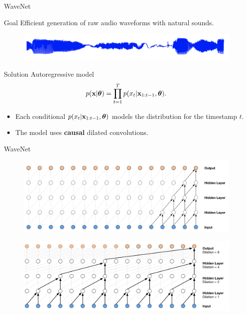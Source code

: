 \begin{frame}{WaveNet}
	\begin{block}{Goal}
		Efficient generation of raw audio waveforms with natural sounds.
	\end{block}
	\begin{figure}
	  \centering
	  \includegraphics[width=0.9\linewidth]{figs/wavenet_ex.png}
	\end{figure}
	\begin{block}{Solution}
		Autoregressive model
		\vspace{-0.3cm}
		\[
		    p(\mathbf{x}| \boldsymbol{\theta}) = \prod_{t=1}^T p(x_t|\mathbf{x}_{1:t-1}, \boldsymbol{\theta}).
		\]
		\vspace{-0.3cm}
	\end{block}
	\begin{itemize}
		\item Each conditional $p(x_t|\mathbf{x}_{1:t-1}, \boldsymbol{\theta})$ models the distribution for the timestamp $t$.
		\item The model uses \textbf{causal} dilated convolutions.
	\end{itemize}
\end{frame}
\begin{frame}{WaveNet}
	\begin{figure}
	    \centering
	    \includegraphics[width=0.9\linewidth]{figs/wavenet1.png}
	\end{figure}
	
	\begin{figure}
	    \centering
	    \includegraphics[width=0.9\linewidth]{figs/wavenet2.png}
	\end{figure}
\end{frame}
